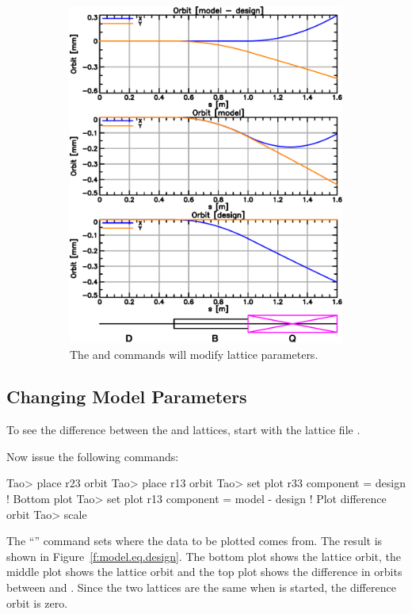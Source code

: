 \documentclass{hitec}     %
\begin{document}
{{{{\begin{figure}[tb]
\begin{subfigure}[t]{0.48\textwidth}
    \includegraphics[width=\textwidth]{figures/changed-model.pdf}
    \caption{The  and  commands will modify  lattice parameters.}
    \label{f:changed.model}
  \end{subfigure}
  \caption{}
\end{figure}

\subsection{Changing Model Parameters}
\label{s:change}

To see the difference between the  and  lattices, start \tao with the lattice file .

Now issue the following commands:
\begin{code}
Tao> place r23 orbit
Tao> place r13 orbit
Tao> set plot r33 component = design          ! Bottom plot
Tao> set plot r13 component = model - design  ! Plot difference orbit
Tao> scale
\end{code}
The ``'' command sets where the data to be plotted
comes from.  The result is shown in Figure~\ref{f:model.eq.design}. The bottom plot shows the
 lattice orbit, the middle plot shows the  lattice orbit and the top plot shows
the difference in orbits between  and . Since the two lattices are the same
when \tao is started, the difference orbit is zero.

}}}}
\end{document}
